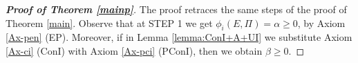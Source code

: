 \documentclass[preprint,11pt,authoryear]{elsarticle}
\theoremstyle{plain}
\begin{document}
\begin{proof}[\bf Proof of Theorem \ref{mainp}]
	The proof retraces the same steps of the proof of Theorem \ref{main}. Observe that at STEP 1 we get $\phi_i(E,\Pi)=\alpha\geq 0$, by Axiom \ref{Ax-pen} (EP). Moreover, if in Lemma \ref{lemma:ConI+A+UI} we substitute Axiom \ref{Ax-ci} (ConI) with Axiom \ref{Ax-pci} (PConI), then we obtain $\beta\geq0$.
\end{proof}






\end{document}
